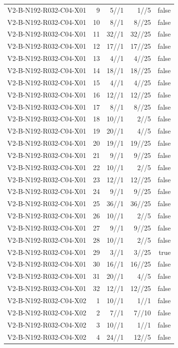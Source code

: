 {\begin{longtable}{lrrrr}
V2-B-N192-R032-C04-X01 & 9 & 5//1 & 1//5 & false \\
V2-B-N192-R032-C04-X01 & 10 & 8//1 & 8//25 & false \\
V2-B-N192-R032-C04-X01 & 11 & 32//1 & 32//25 & false \\
V2-B-N192-R032-C04-X01 & 12 & 17//1 & 17//25 & false \\
V2-B-N192-R032-C04-X01 & 13 & 4//1 & 4//25 & false \\
V2-B-N192-R032-C04-X01 & 14 & 18//1 & 18//25 & false \\
V2-B-N192-R032-C04-X01 & 15 & 4//1 & 4//25 & false \\
V2-B-N192-R032-C04-X01 & 16 & 12//1 & 12//25 & false \\
V2-B-N192-R032-C04-X01 & 17 & 8//1 & 8//25 & false \\
V2-B-N192-R032-C04-X01 & 18 & 10//1 & 2//5 & false \\
V2-B-N192-R032-C04-X01 & 19 & 20//1 & 4//5 & false \\
V2-B-N192-R032-C04-X01 & 20 & 19//1 & 19//25 & false \\
V2-B-N192-R032-C04-X01 & 21 & 9//1 & 9//25 & false \\
V2-B-N192-R032-C04-X01 & 22 & 10//1 & 2//5 & false \\
V2-B-N192-R032-C04-X01 & 23 & 12//1 & 12//25 & false \\
V2-B-N192-R032-C04-X01 & 24 & 9//1 & 9//25 & false \\
V2-B-N192-R032-C04-X01 & 25 & 36//1 & 36//25 & false \\
V2-B-N192-R032-C04-X01 & 26 & 10//1 & 2//5 & false \\
V2-B-N192-R032-C04-X01 & 27 & 9//1 & 9//25 & false \\
V2-B-N192-R032-C04-X01 & 28 & 10//1 & 2//5 & false \\
V2-B-N192-R032-C04-X01 & 29 & 3//1 & 3//25 & true \\
V2-B-N192-R032-C04-X01 & 30 & 16//1 & 16//25 & false \\
V2-B-N192-R032-C04-X01 & 31 & 20//1 & 4//5 & false \\
V2-B-N192-R032-C04-X01 & 32 & 12//1 & 12//25 & false \\
V2-B-N192-R032-C04-X02 & 1 & 10//1 & 1//1 & false \\
V2-B-N192-R032-C04-X02 & 2 & 7//1 & 7//10 & false \\
V2-B-N192-R032-C04-X02 & 3 & 10//1 & 1//1 & false \\
V2-B-N192-R032-C04-X02 & 4 & 24//1 & 12//5 & false \\

\end{longtable}}
